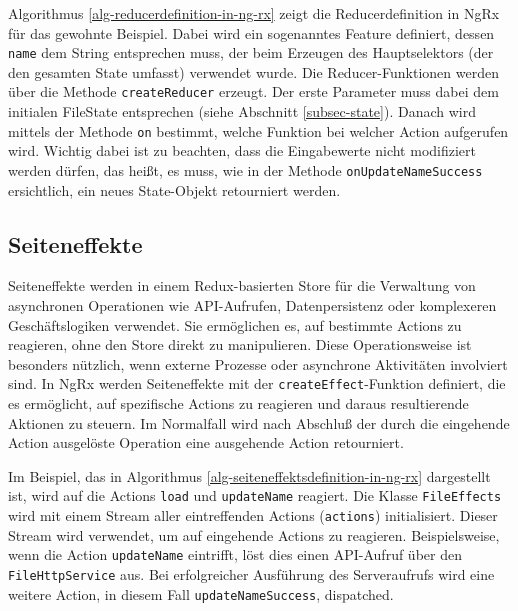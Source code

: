 \documentclass[12pt]{book}          %
\begin{document}
Algorithmus \ref{alg-reducerdefinition-in-ng-rx} zeigt die Reducerdefinition in NgRx für das gewohnte Beispiel. Dabei wird ein sogenanntes Feature definiert, dessen \texttt{name} dem String entsprechen muss, der beim Erzeugen des Hauptselektors (der den gesamten State umfasst) verwendet wurde. Die Reducer-Funktionen werden über die Methode \texttt{createReducer} erzeugt. Der erste Parameter muss dabei dem initialen FileState entsprechen (siehe Abschnitt \ref{subsec-state}). Danach wird mittels der Methode \texttt{on} bestimmt, welche Funktion bei welcher Action aufgerufen wird. Wichtig dabei ist zu beachten, dass die Eingabewerte nicht modifiziert werden dürfen, das heißt, es muss, wie in der Methode \texttt{onUpdateNameSuccess} ersichtlich, ein neues State-Objekt retourniert werden.


\subsection{Seiteneffekte}
\label{subsec-seiteneffekte}
Seiteneffekte werden in einem Redux-basierten Store für die Verwaltung von asynchronen Operationen wie API-Aufrufen, Datenpersistenz oder komplexeren Geschäftslogiken verwendet. Sie ermöglichen es, auf bestimmte Actions zu reagieren, ohne den Store direkt zu manipulieren. Diese Operationsweise ist besonders nützlich, wenn externe Prozesse oder asynchrone Aktivitäten involviert sind. In NgRx werden Seiteneffekte mit der \texttt{createEffect}-Funktion definiert, die es ermöglicht, auf spezifische Actions zu reagieren und daraus resultierende Aktionen zu steuern. Im Normalfall wird nach Abschluß der durch die eingehende Action ausgelöste Operation eine ausgehende Action retourniert.

Im Beispiel, das in Algorithmus \ref{alg-seiteneffektsdefinition-in-ng-rx} dargestellt ist, wird auf die Actions \texttt{load} und \texttt{updateName} reagiert. Die Klasse \texttt{FileEffects} wird mit einem Stream aller eintreffenden Actions (\texttt{actions}) initialisiert. Dieser Stream wird verwendet, um auf eingehende Actions zu reagieren. Beispielsweise, wenn die Action \texttt{updateName} eintrifft, löst dies einen API-Aufruf über den \texttt{FileHttpService} aus. Bei erfolgreicher Ausführung des Serveraufrufs wird eine weitere Action, in diesem Fall \texttt{updateNameSuccess}, dispatched.
\end{document}
